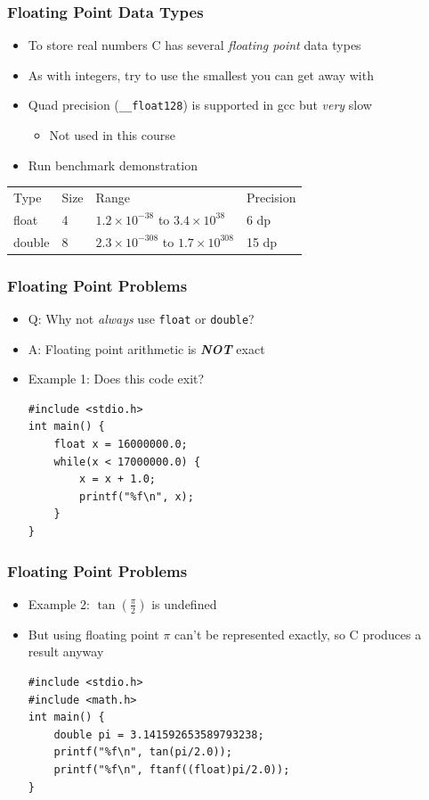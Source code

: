 \documentclass[14pt]{beamer}
\begin{document}
\begin{frame}[fragile]
\frametitle{Floating Point Data Types}
\begin{itemize}
\item To store real numbers C has several \textit{floating point} data types
\item As with integers, try to use the smallest you can get away with
\item Quad precision (\texttt{\_\_float128}) is supported in gcc but \textit{very} slow
	\begin{itemize}
		\item Not used in this course
	\end{itemize}
\item Run benchmark demonstration
\end{itemize}

\begin{table}[] \small
\begin{tabular}{llll}
Type        & Size & Range                                             & Precision \\
float       & 4    & $1.2\times 10^{-38}$ to $3.4 \times 10^{38}$      & 6 dp      \\
double      & 8    & $2.3 \times 10^{-308}$ to $1.7 \times 10^{308}$     & 15 dp     \\   
\end{tabular}
\end{table}
\end{frame}

\begin{frame}[fragile]
\frametitle{Floating Point Problems}
\begin{itemize}
\item Q: Why not \textit{always} use \texttt{float} or \texttt{double}?
\item A: Floating point arithmetic is \textbf{\textit{NOT}} exact
\item Example 1: Does this code exit?
\begin{lstlisting}[style=CStyle,caption=\texttt{floatLoop.c}]
#include <stdio.h>
int main() {
	float x = 16000000.0;
	while(x < 17000000.0) {
		x = x + 1.0;
		printf("%f\n", x);
	}
}
\end{lstlisting}
\end{itemize}
\end{frame}

\begin{frame}[fragile]
\frametitle{Floating Point Problems}
\begin{itemize}
\item Example 2: $\tan \left( \frac{\pi}{2} \right)$ is undefined
\item But using floating point $\pi$ can't be represented exactly, so C produces a result anyway
\begin{lstlisting}[style=CStyle,caption=\texttt{taninf.c}]
#include <stdio.h>
#include <math.h>
int main() {
	double pi = 3.141592653589793238;
	printf("%f\n", tan(pi/2.0));
	printf("%f\n", ftanf((float)pi/2.0));
}
\end{lstlisting}
\end{itemize}
\end{frame}
\end{document}
